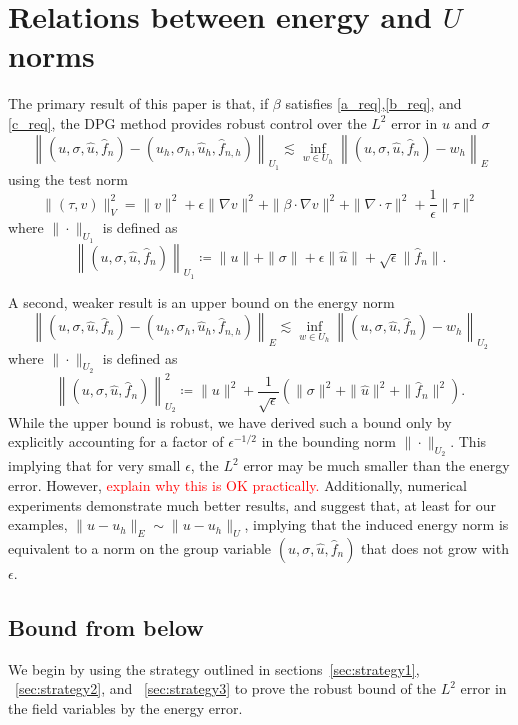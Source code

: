 \documentclass[11pt,onecolumn]{scrartcl}
\newcommand{\grad}{\nabla}
\renewcommand{\div}{\grad \cdot}
\begin{document}
\section{Relations between energy and $U$ norms}
\label{sec:main_bounds}
The primary result of this paper is that, if $\beta$ satisfies \ref{a_req},\ref{b_req}, and \ref{c_req}, the DPG method provides robust control over the $L^2$ error in $u$ and $\sigma$
\[
\left\|\left(u,\sigma,\widehat{u},\widehat{f}_n\right)-\left(u_h,\sigma_h,\widehat{u}_h,\widehat{f}_{n,h}\right)\right\|_{U_1} \lesssim \inf_{w\in U_h}\left\|\left(u,\sigma,\widehat{u},\widehat{f}_n\right)-w_h \right\|_{E}
\]
using the test norm
\[
\|\left(\tau, v\right)\|_{V}^2 = \|v\|^2 + \epsilon \|\grad v\|^2 + \|\beta \cdot \grad v\|^2 + \| \div \tau\|^2 + \frac{1}{\epsilon}\|\tau\|^2
\]
where $\|\cdot \|_{U_1}$ is defined as
\[
\left\|\left(u,\sigma,\widehat{u},\widehat{f}_n\right)\right\|_{U_1} \coloneqq \|u\| + \|\sigma\| + \epsilon\|\widehat{u}\|+\sqrt{\epsilon} \|\widehat{f}_n\|.
\]

A second, weaker result is an upper bound on the energy norm
\[
\left\|\left(u,\sigma,\widehat{u},\widehat{f}_n\right)-\left(u_h,\sigma_h,\widehat{u}_h,\widehat{f}_{n,h}\right)\right\|_{E} \lesssim \inf_{w\in U_h}\left\|\left(u,\sigma,\widehat{u},\widehat{f}_n\right)-w_h\right\|_{U_2}
\]
where $\|\cdot \|_{U_2}$ is defined as
\[
\left\|\left(u,\sigma,\widehat{u},\widehat{f}_n\right)\right\|_{U_2}^2 \coloneqq \|u\|^2 + \frac{1}{\sqrt{\epsilon}}\left(\|\sigma\|^2 + \|\widehat{u}\|^2+ \|\widehat{f}_n\|^2\right).
\]
While the upper bound is robust, we have derived such a bound only by explicitly accounting for a factor of $\epsilon^{-1/2}$ in the bounding norm $\|\cdot \|_{U_2}$.  This implying that for very small $\epsilon$, the $L^2$ error may be much smaller than the energy error.  However, \textcolor{red}{explain why this is OK practically.}
Additionally, numerical experiments demonstrate much better results, and suggest that, at least for our examples, $\|u-u_h\|_E \sim \|u-u_h\|_{U}$, implying that the induced energy norm is equivalent to a norm on the group variable $\left(u,\sigma,\widehat{u},\widehat{f}_n\right)$ that does not grow with $\epsilon$.  

\subsection{Bound from below}

We begin by using the strategy outlined in sections~\ref{sec:strategy1}, ~\ref{sec:strategy2}, and ~\ref{sec:strategy3} to prove the robust bound of the $L^2$ error in the field variables by the energy error.  
\end{document}
